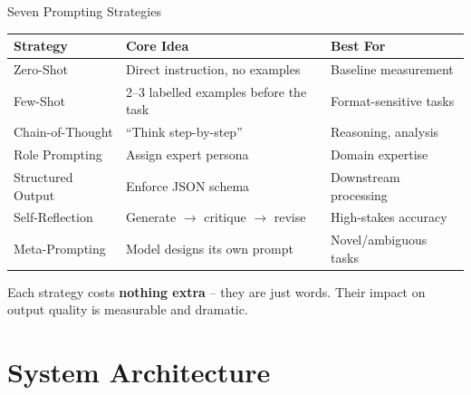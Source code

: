 \documentclass[aspectratio=169, 12pt]{beamer}
\begin{document}
\begin{frame}{Seven Prompting Strategies}
  \small
  \begin{tabular}{@{}lll@{}}
    \toprule
    \textbf{Strategy} & \textbf{Core Idea} & \textbf{Best For} \\
    \midrule
    Zero-Shot         & Direct instruction, no examples            & Baseline measurement \\
    Few-Shot          & 2--3 labelled examples before the task     & Format-sensitive tasks \\
    Chain-of-Thought  & ``Think step-by-step''                     & Reasoning, analysis \\
    Role Prompting    & Assign expert persona                      & Domain expertise \\
    Structured Output & Enforce JSON schema                        & Downstream processing \\
    Self-Reflection   & Generate $\rightarrow$ critique $\rightarrow$ revise  & High-stakes accuracy \\
    Meta-Prompting    & Model designs its own prompt               & Novel/ambiguous tasks \\
    \bottomrule
  \end{tabular}
  \vspace{0.8em}
  \begin{exampleblock}{}
    Each strategy costs \textbf{nothing extra} -- they are just words.
    Their impact on output quality is measurable and dramatic.
  \end{exampleblock}
\end{frame}

\section{System Architecture}
\end{document}
